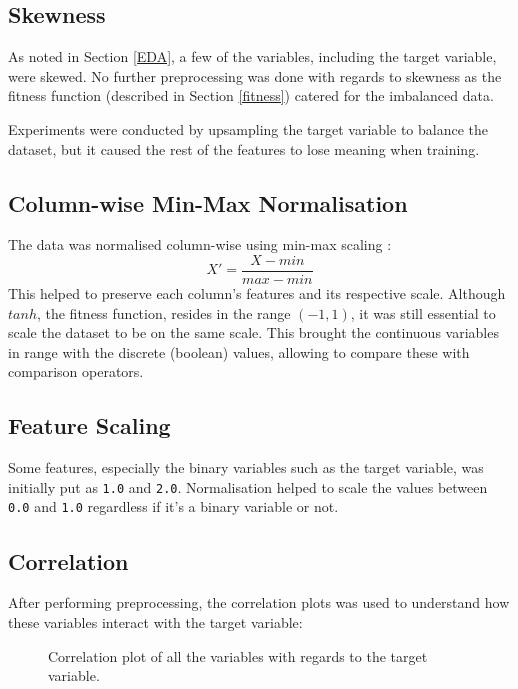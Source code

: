 \documentclass{article}
\begin{document}
\subsection{Skewness}
As noted in Section \ref{EDA}, a few of the variables, including the target variable, were skewed. No further preprocessing was done with regards to skewness as the fitness function (described in Section \ref{fitness}) catered for the imbalanced data.

Experiments were conducted by upsampling the target variable to balance the dataset, but it caused the rest of the features to lose meaning when training.

\subsection{Column-wise Min-Max Normalisation}
The data was normalised column-wise using min-max scaling \cite{patro_2015_normalization}:
\begin{equation}\label{norm}
  X' = \frac{X-min}{max-min}
\end{equation}
This helped to preserve each column's features and its respective scale. Although \(tanh\), the fitness function, resides in the range \((-1,1)\), it was still essential to scale the dataset to be on the same scale. This brought the continuous variables in range with the discrete (boolean) values, allowing to compare these with comparison operators.

\subsection{Feature Scaling}
Some features, especially the binary variables such as the target variable, was initially put as \texttt{1.0} and \texttt{2.0}. Normalisation helped to scale the values between \texttt{0.0} and \texttt{1.0} regardless if it's a binary variable or not.

\subsection{Correlation}
After performing preprocessing, the correlation plots was used to understand how these variables interact with the target variable:

\begin{figure}[H]
  \caption{Correlation plot of all the variables with regards to the target variable.}
  \label{fig:corr}
\end{figure}
\end{document}
